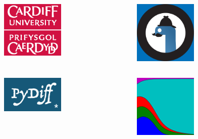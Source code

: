 \documentclass{beamer}
\begin{document}
    \begin{frame}
            \begin{columns}
                \begin{column}{.5\textwidth}
                    \begin{center}
                        \includegraphics[width=3cm]{./static/CUident_CMYK.eps}
                    \end{center}
                \end{column}
                \begin{column}{.5\textwidth}
                    \begin{center}
                        \includegraphics[width=3cm]{./static/pycon_uk.png}
                    \end{center}
                \end{column}
            \end{columns}

            \begin{columns}
                \begin{column}{.5\textwidth}
                    \begin{center}
                        \includegraphics[width=3cm]{./static/PyDiff_logo.png}
                    \end{center}
                \end{column}
                \begin{column}{.5\textwidth}
                    \begin{center}
                        \includegraphics[width=3cm]{./static/axelrod_logo.png}
                    \end{center}
                \end{column}
            \end{columns}
    \end{frame}
\end{document}
